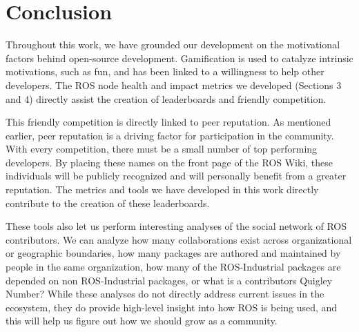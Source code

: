 \documentclass[letterpaper, 10 pt, conference]{ieeeconf}  %
\begin{document}
\section{Conclusion}

Throughout this work, we have grounded our development on the motivational factors behind open-source development. Gamification is used to catalyze intrinsic motivations, such as fun, and has been linked to a willingness to help other developers. The ROS node health and impact metrics we developed (Sections 3 and 4) directly assist the creation of leaderboards and friendly competition.

This friendly competition is directly linked to peer reputation. As mentioned earlier, peer reputation is a driving factor for participation in the community. With every competition, there must be a small number of top performing developers. By placing these names on the front page of the ROS Wiki, these individuals will be publicly recognized and will personally benefit from a greater reputation. The metrics and tools we have developed in this work directly contribute to the creation of these leaderboards.

These tools also let us perform interesting analyses of the social network of ROS contributors. We can analyze how many collaborations exist across organizational or geographic boundaries, how many packages are authored and maintained by people in the same organization, how many of the ROS-Industrial packages are depended on non ROS-Industrial packages, or what is a contributors Quigley Number? While these analyses do not directly address current issues in the ecosystem, they do provide high-level insight into how ROS is being used, and this will help us figure out how we should grow as a community.

\addtolength{\textheight}{-12cm}   %










\end{document}
